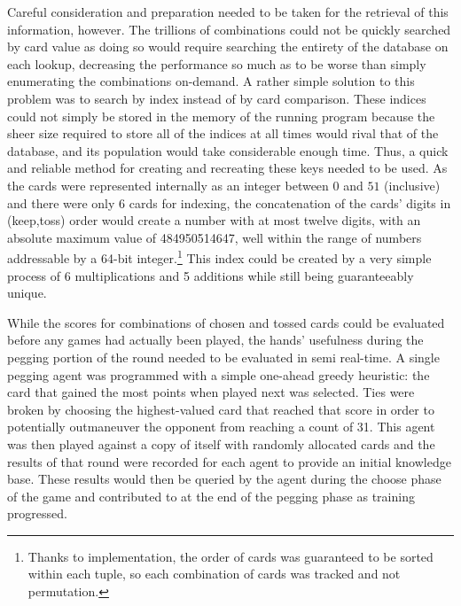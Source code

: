 Careful consideration and preparation needed to be taken
for the retrieval of this information, however.
%
The trillions of combinations could not be quickly searched by card value as
doing so would require searching the entirety of the database on each lookup,
decreasing the performance so much as to be worse than simply
enumerating the combinations on-demand.
%
A rather simple solution to this problem was to search by index
instead of by card comparison.
%
These indices could not simply be stored in the memory of the running program
because the sheer size required to store all of the indices at all times
would rival that of the database,
and its population would take considerable enough time.
%
Thus, a quick and reliable method for creating and recreating these keys
needed to be used.
%
As the cards were represented internally as an integer between $0$ and $51$
(inclusive)
and there were only 6 cards for indexing,
the concatenation of the cards' digits in (keep,toss) order
would create a number with at most twelve digits,
with an absolute maximum value of 484950514647,
well within the range of numbers addressable by a 64-bit integer.\footnote{
	Thanks to implementation,
	the order of cards was guaranteed to be sorted within each tuple,
	so each combination of cards was tracked and not permutation.
}
%
This index could be created by a very simple process of 6 multiplications and
5 additions
while still being guaranteeably unique.

While the scores for combinations of chosen and tossed cards could be evaluated 
before any games had actually been played,
the hands' usefulness during the pegging portion of the round needed to be
evaluated in semi real-time.
%
A single pegging agent was programmed with a simple one-ahead greedy heuristic:
the card that gained the most points when played next was selected.
%
Ties were
broken by choosing the highest-valued card that reached that score
in order to potentially outmaneuver the opponent from reaching a count of 31.
%
This agent was then played against a copy of itself with randomly allocated
cards and the results of that round were recorded for each agent to provide an
initial knowledge base.
%
These results would then be queried by the agent during the choose phase of the
game and contributed to at the end of the pegging phase as training progressed.

